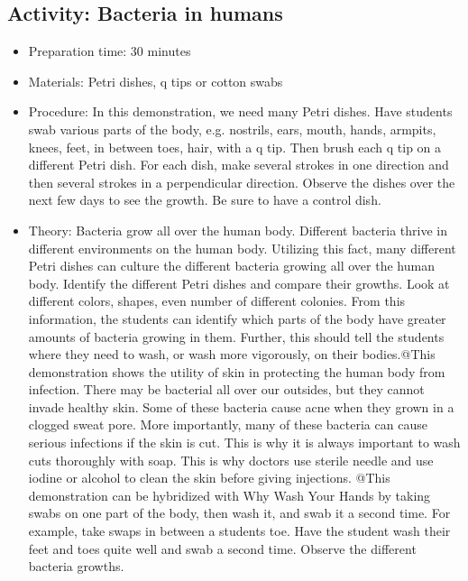 \subsection{Activity: Bacteria in humans}
\begin{itemize}
\item{Preparation time: 30 minutes}
\item{Materials: Petri dishes, q tips or cotton swabs}
\item{Procedure: In this demonstration, we need many Petri dishes. Have students swab various parts of the body, e.g. nostrils, ears, mouth, hands, armpits, knees, feet, in between toes, hair, with a q tip. Then brush each q tip on a different Petri dish. For each dish, make several strokes in one direction and then several strokes in a perpendicular direction. Observe the dishes over the next few days to see the growth. Be sure to have a control dish.}
\item{Theory: Bacteria grow all over the human body. Different bacteria thrive in different environments on the human body. Utilizing this fact, many different Petri dishes can culture the different bacteria growing all over the human body. Identify the different Petri dishes and compare their growths. Look at different colors, shapes, even number of different colonies. From this information, the students can identify which parts of the body have greater amounts of bacteria growing in them. Further, this should tell the students where they need to wash, or wash more vigorously, on their bodies.@This demonstration shows the utility of skin in protecting the human body from infection. There may be bacterial all over our outsides, but they cannot invade healthy skin. Some of these bacteria cause acne when they grown in a clogged sweat pore. More importantly, many of these bacteria can cause serious infections if the skin is cut. This is why it is always important to wash cuts thoroughly with soap. This is why doctors use sterile needle and use iodine or alcohol to clean the skin before giving injections. @This demonstration can be hybridized with Why Wash Your Hands by taking swabs on one part of the body, then wash it, and swab it a second time. For example, take swaps in between a students toe. Have the student wash their feet and toes quite well and swab a second time. Observe the different bacteria growths. }
\end{itemize}

